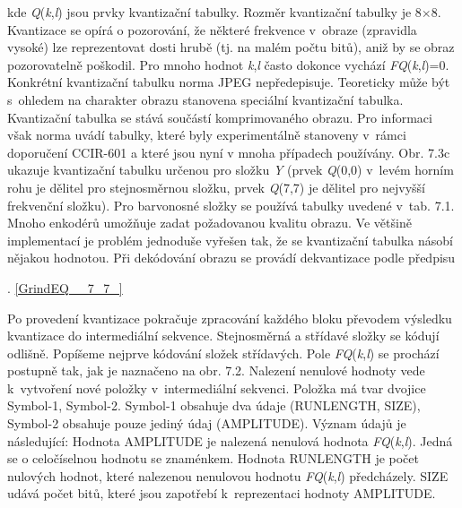 \noindent kde \textit{Q}(\textit{k},\textit{l}) jsou prvky kvantizační tabulky. Rozměr kvantizační tabulky je 8$\times$8. Kvantizace se opírá o pozorování, že některé frekvence v~obraze (zpravidla vysoké) lze reprezentovat dosti hrubě (tj. na malém počtu bitů), aniž by se obraz pozorovatelně poškodil. Pro mnoho hodnot \textit{k},\textit{l} často dokonce vychází \textit{FQ}(\textit{k},\textit{l})=0. Konkrétní kvantizační tabulku norma JPEG nepředepisuje. Teoreticky může být s~ohledem na charakter obrazu stanovena speciální kvantizační tabulka. Kvantizační tabulka se stává součástí komprimovaného obrazu. Pro informaci však norma uvádí tabulky, které byly experimentálně stanoveny v~rámci doporučení CCIR-601 a které jsou nyní v mnoha případech používány. Obr. 7.3c ukazuje kvantizační tabulku určenou pro složku \textit{Y} (prvek \textit{Q}(0,0) v~levém horním rohu je dělitel pro stejnosměrnou složku, prvek \textit{Q}(7,7) je dělitel pro nejvyšší frekvenční složku). Pro barvonosné složky se používá tabulky uvedené v~tab. 7.1. Mnoho enkodérů umožňuje zadat požadovanou kvalitu obrazu. Ve většině implementací je problém jednoduše vyřešen tak, že se kvantizační tabulka násobí nějakou hodnotou. Při dekódování obrazu se provádí dekvantizace podle předpisu

\noindent 

 . \eqref{GrindEQ__7_7_}

\noindent Po provedení kvantizace pokračuje zpracování každého bloku převodem výsledku kvantizace do intermediální sekvence. Stejnosměrná a střídavé složky se kódují odlišně. Popíšeme nejprve kódování složek střídavých. Pole \textit{FQ}(\textit{k},\textit{l}) se prochází postupně tak, jak je naznačeno na obr. 7.2. Nalezení nenulové hodnoty vede k~vytvoření nové položky v~intermediální sekvenci. Položka má tvar dvojice Symbol-1, Symbol-2. Symbol-1 obsahuje dva údaje (RUNLENGTH, SIZE), Symbol-2 obsahuje pouze jediný údaj (AMPLITUDE). Význam údajů je následující: Hodnota AMPLITUDE je nalezená nenulová hodnota \textit{FQ}(\textit{k},\textit{l}). Jedná se o celočíselnou hodnotu se znaménkem. Hodnota RUNLENGTH je počet nulových hodnot, které nalezenou nenulovou hodnotu \textit{FQ}(\textit{k},\textit{l}) předcházely. SIZE udává počet bitů, které jsou zapotřebí k~reprezentaci hodnoty AMPLITUDE.

\noindent 

